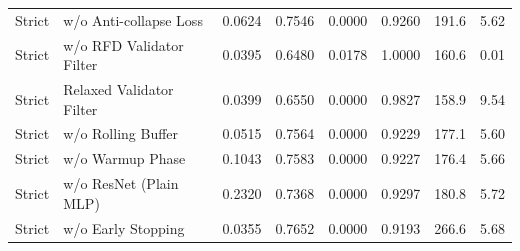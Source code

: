 \begin{tabular}{llllllll}
Strict & w/o Anti-collapse Loss & 0.0624 & 0.7546 & 0.0000 & 0.9260 & 191.6 & 5.62 \\
Strict & w/o RFD Validator Filter & 0.0395 & 0.6480 & 0.0178 & 1.0000 & 160.6 & 0.01 \\
Strict & Relaxed Validator Filter & 0.0399 & 0.6550 & 0.0000 & 0.9827 & 158.9 & 9.54 \\
Strict & w/o Rolling Buffer & 0.0515 & 0.7564 & 0.0000 & 0.9229 & 177.1 & 5.60 \\
Strict & w/o Warmup Phase & 0.1043 & 0.7583 & 0.0000 & 0.9227 & 176.4 & 5.66 \\
Strict & w/o ResNet (Plain MLP) & 0.2320 & 0.7368 & 0.0000 & 0.9297 & 180.8 & 5.72 \\
Strict & w/o Early Stopping & 0.0355 & 0.7652 & 0.0000 & 0.9193 & 266.6 & 5.68 \\
\bottomrule
\end{tabular}
